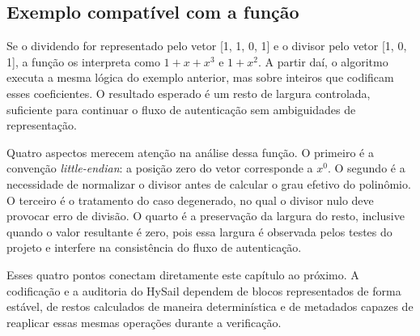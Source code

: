 \subsection{Exemplo compatível com a função}%
Se o dividendo for representado pelo vetor [1, 1, 0, 1] e o divisor pelo vetor [1, 0, 1], a função os interpreta como $1 + x + x^3$ e $1 + x^2$. A partir daí, o algoritmo executa a mesma lógica do exemplo anterior, mas sobre inteiros que codificam esses coeficientes. O resultado esperado é um resto de largura controlada, suficiente para continuar o fluxo de autenticação sem ambiguidades de representação.

Quatro aspectos merecem atenção na análise dessa função. O primeiro é a convenção \emph{little-endian}: a posição zero do vetor corresponde a $x^0$. O segundo é a necessidade de normalizar o divisor antes de calcular o grau efetivo do polinômio. O terceiro é o tratamento do caso degenerado, no qual o divisor nulo deve provocar erro de divisão. O quarto é a preservação da largura do resto, inclusive quando o valor resultante é zero, pois essa largura é observada pelos testes do projeto e interfere na consistência do fluxo de autenticação.

Esses quatro pontos conectam diretamente este capítulo ao próximo. A codificação e a auditoria do HySail dependem de blocos representados de forma estável, de restos calculados de maneira determinística e de metadados capazes de reaplicar essas mesmas operações durante a verificação.
